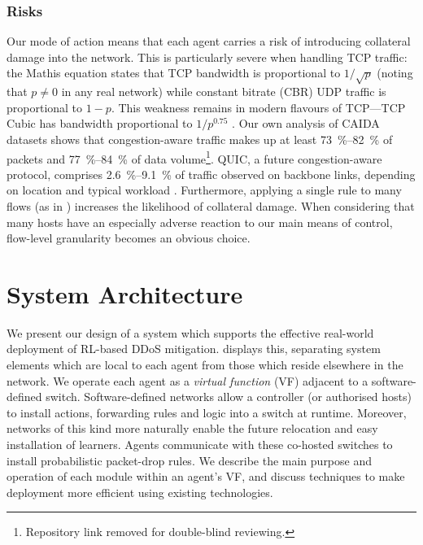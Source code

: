 \documentclass[10pt, times, conference, letterpaper]{IEEEtran}
\begin{document}
\subsubsection{Risks}
Our mode of action means that each agent carries a risk of introducing collateral damage into the network.
This is particularly severe when handling TCP traffic: the Mathis equation \cite{DBLP:journals/ccr/MathisSMO97} states that TCP bandwidth is proportional to $1/\sqrt{p}$ (noting that $p\ne0$ in any real network) while constant bitrate (CBR) UDP traffic is proportional to $1 - p$.
This weakness remains in modern flavours of TCP---TCP Cubic has bandwidth proportional to $1/p^{0.75}$ \cite{rfc8312}.
Our own analysis of CAIDA datasets \cite{caida-2018-passive} shows that congestion-aware traffic makes up at least \SIrange{73}{82}{\percent} of packets and \SIrange{77}{84}{\percent} of data volume\footnote{Repository link removed for double-blind reviewing.}.
QUIC, a future congestion-aware protocol, comprises \SIrange{2.6}{9.1}{\percent} of traffic observed on backbone links, depending on location and typical workload \cite{DBLP:conf/pam/RuthPDH18}.
Furthermore, applying a single rule to many flows (as in \textcite{DBLP:journals/eaai/MalialisK15}) increases the likelihood of collateral damage.
When considering that many hosts have an especially adverse reaction to our main means of control, flow-level granularity becomes an obvious choice.

\section{System Architecture}\label{sec:system-architecture}

We present our design of a system which supports the effective real-world deployment of RL-based DDoS mitigation.
 displays this, separating system elements which are local to each agent from those which reside elsewhere in the network.
We operate each agent as a \emph{virtual function} (VF) adjacent to a software-defined switch.
Software-defined networks allow a controller (or authorised hosts) to install actions, forwarding rules and logic into a switch at runtime.
Moreover, networks of this kind more naturally enable the future relocation and easy installation of learners.
Agents communicate with these co-hosted switches to install probabilistic packet-drop rules.
We describe the main purpose and operation of each module within an agent's VF, and discuss techniques to make deployment more efficient using existing technologies.
\end{document}
